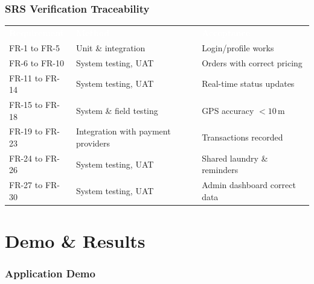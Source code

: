 \documentclass[aspectratio=169,professionalfonts,10pt]{beamer}
\begin{document}
\begin{frame}
    \frametitle{SRS Verification Traceability}
    \small
    \begin{table}
        \centering\scriptsize
        \begin{tabular}{lll}
            \rowcolor{ugmBlue!40}
            \textcolor{white}{\textbf{Requirement}} & \textcolor{white}{\textbf{Method}} & \textcolor{white}{\textbf{Acceptance}} \\
            FR-1 to FR-5 & Unit \& integration & Login/profile works \\
            FR-6 to FR-10 & System testing, UAT & Orders with correct pricing \\
            FR-11 to FR-14 & System testing, UAT & Real-time status updates \\
            FR-15 to FR-18 & System \& field testing & GPS accuracy $<10$\,m \\
            FR-19 to FR-23 & Integration with payment providers & Transactions recorded \\
            FR-24 to FR-26 & System testing, UAT & Shared laundry \& reminders \\
            FR-27 to FR-30 & System testing, UAT & Admin dashboard correct data \\
        \end{tabular}
    \end{table}
\end{frame}

\section{Demo \& Results}

\ugmcenteredlogoslide
\begin{frame}
    \frametitle{Application Demo}
\end{frame}
\end{document}
